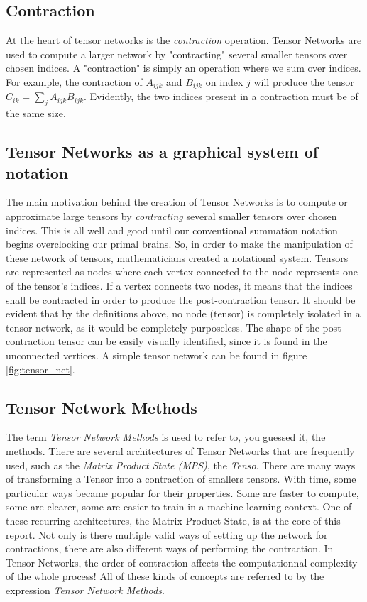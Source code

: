 \documentclass{article}
\theoremstyle{definition}
\theoremstyle{definition}
\begin{document}
\subsection{Contraction}
At the heart of tensor networks is the {\it contraction} operation.
Tensor Networks are used to compute a larger network by "contracting" several
smaller tensors over chosen indices. A "contraction" is simply an operation 
where we sum over indices. For example, the contraction of $A_{ijk}$ and 
$B_{ijk}$ on index $j$ will produce the tensor $C_{ik} = \sum_{j} A_{ijk} B_{ijk}$.
Evidently, the two indices present in a contraction must be of the same size.

\subsection{Tensor Networks as a graphical system of notation}
The main motivation behind the creation of Tensor Networks is to compute or approximate large tensors by {\it contracting} several smaller tensors over chosen indices. 
This is all well and good until our conventional summation notation begins overclocking our primal brains.
So, in order to make the manipulation of these network of tensors, mathematicians created a notational system. 
Tensors are represented as nodes where each vertex connected to the node represents one of the tensor's indices. 
If a vertex connects two nodes, it means that the indices shall be contracted in order to produce the post-contraction tensor. 
It should be evident that by the definitions above, no node (tensor) is completely isolated in a tensor network, as it would be completely purposeless. 
The shape of the post-contraction tensor can be easily visually identified, since it is found in the unconnected vertices.
A simple tensor network can be found in figure \ref{fig:tensor_net}.

\subsection{Tensor Network Methods}
The term {\it Tensor Network Methods} is used to refer to, you guessed it, the methods.
There are several architectures of Tensor Networks that are frequently used, such as the {\it Matrix Product State (MPS)}, the {\it Tenso}.
There are many ways of transforming a Tensor into a contraction of smallers tensors. 
With time, some particular ways became popular for their properties. 
Some are faster to compute, some are clearer, some are easier to train in a machine learning context. 
One of these recurring architectures, the Matrix Product State, is at the core of this report.
Not only is there multiple valid ways of setting up the network for contractions, there are also different ways of performing the contraction.
In Tensor Networks, the order of contraction affects the computationnal complexity of the whole process!
All of these kinds of concepts are referred to by the expression \emph{Tensor Network Methods}. 
\end{document}
